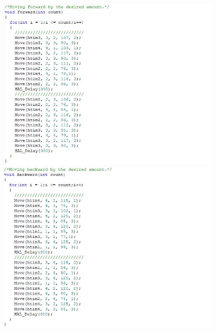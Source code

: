	\begin{figure}[!h]
	\centering
	\includegraphics[width=\columnwidth]{./Images/Appendix/IMG_11.JPG}
		
	\vspace{0.5cm}
	\includegraphics[width=\columnwidth]{./Images/Appendix/IMG_12.JPG}
	\end{figure}
	
